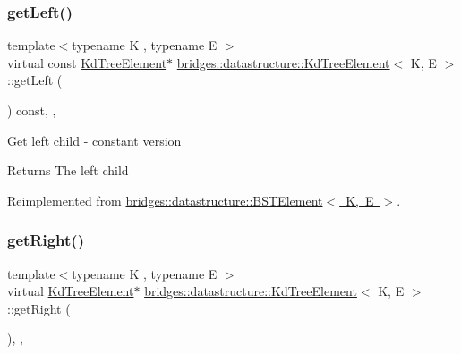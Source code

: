 \subsubsection{\texorpdfstring{get\+Left()}{getLeft()}\hspace{0.1cm}{\footnotesize\ttfamily [2/2]}}
{\footnotesize\ttfamily template$<$typename K , typename E $>$ \\
virtual const \mbox{\hyperlink{classbridges_1_1datastructure_1_1_kd_tree_element}{Kd\+Tree\+Element}}$\ast$ \mbox{\hyperlink{classbridges_1_1datastructure_1_1_kd_tree_element}{bridges\+::datastructure\+::\+Kd\+Tree\+Element}}$<$ K, E $>$\+::get\+Left (\begin{DoxyParamCaption}{ }\end{DoxyParamCaption}) const\hspace{0.3cm}{\ttfamily [inline]}, {\ttfamily [override]}, {\ttfamily [virtual]}}

Get left child -\/ constant version

\begin{DoxyReturn}{Returns}
The left child 
\end{DoxyReturn}


Reimplemented from \mbox{\hyperlink{classbridges_1_1datastructure_1_1_b_s_t_element_abac324ef0b480420bd82ecfe4501d60d}{bridges\+::datastructure\+::\+B\+S\+T\+Element$<$ K, E $>$}}.

\mbox{\label{classbridges_1_1datastructure_1_1_kd_tree_element_a366e3b0987169220d3a145043be2373d}} 
\subsubsection{\texorpdfstring{get\+Right()}{getRight()}\hspace{0.1cm}{\footnotesize\ttfamily [1/2]}}
{\footnotesize\ttfamily template$<$typename K , typename E $>$ \\
virtual \mbox{\hyperlink{classbridges_1_1datastructure_1_1_kd_tree_element}{Kd\+Tree\+Element}}$\ast$ \mbox{\hyperlink{classbridges_1_1datastructure_1_1_kd_tree_element}{bridges\+::datastructure\+::\+Kd\+Tree\+Element}}$<$ K, E $>$\+::get\+Right (\begin{DoxyParamCaption}{ }\end{DoxyParamCaption})\hspace{0.3cm}{\ttfamily [inline]}, {\ttfamily [override]}, {\ttfamily [virtual]}}

